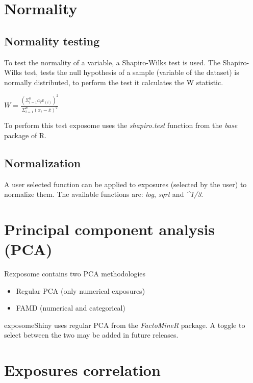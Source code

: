 \documentclass[
]{book}
\providecommand{\tightlist}{%
  \setlength{\itemsep}{0pt}\setlength{\parskip}{0pt}}
\begin{document}
\hypertarget{normality}{%
\section{Normality}\label{normality}}

\hypertarget{normality-testing}{%
\subsection{Normality testing}\label{normality-testing}}

To test the normality of a variable, a Shapiro-Wilks test is used. The Shapiro-Wilks test, tests the null hypothesis of a sample (variable of the dataset) is normally distributed, to perform the test it calculates the W statistic.

\(W = \frac{\left( \Sigma^{n}_{i=1} a_i x_{(i)} \right)^2}{\Sigma^{n}_{i=1} (x_i - \overline{x})^2}\)

To perform this test exposome uses the \emph{shapiro.test} function from the \emph{base} package of R.

\hypertarget{normalization}{%
\subsection{Normalization}\label{normalization}}

A user selected function can be applied to exposures (selected by the user) to normalize them. The available functions are: \emph{log}, \emph{sqrt} and \emph{\^{}1/3}.

\hypertarget{principal-component-analysis-pca}{%
\section{Principal component analysis (PCA)}\label{principal-component-analysis-pca}}

Rexposome contains two PCA methodologies

\begin{itemize}
\tightlist
\item
  Regular PCA \citet{Jolliffe2016} (only numerical exposures)
\item
  FAMD \citet{chavent2014multivariate} (numerical and categorical)
\end{itemize}

exposomeShiny uses regular PCA from the \emph{FactoMineR} package. A toggle to select between the two may be added in future releases.

\hypertarget{exposures-correlation}{%
\section{Exposures correlation}\label{exposures-correlation}}
\end{document}
